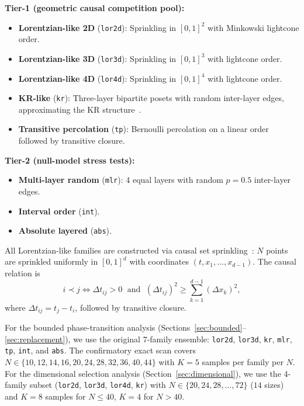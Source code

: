 \documentclass[12pt,a4paper]{article}
\begin{document}
\medskip
\noindent\textbf{Tier-1 (geometric causal competition pool):}
\begin{itemize}[nosep]
\item \textbf{Lorentzian-like 2D} (\texttt{lor2d}): Sprinkling in $[0,1]^2$
with Minkowski lightcone order.
\item \textbf{Lorentzian-like 3D} (\texttt{lor3d}): Sprinkling in $[0,1]^3$
with lightcone order.
\item \textbf{Lorentzian-like 4D} (\texttt{lor4d}): Sprinkling in $[0,1]^4$
with lightcone order.
\item \textbf{KR-like} (\texttt{kr}): Three-layer bipartite posets with random
inter-layer edges, approximating the KR structure~\cite{kleitman1975}.
\item \textbf{Transitive percolation} (\texttt{tp}): Bernoulli percolation on a
linear order followed by transitive closure.
\end{itemize}

\noindent\textbf{Tier-2 (null-model stress tests):}
\begin{itemize}[nosep]
\item \textbf{Multi-layer random} (\texttt{mlr}): 4 equal layers with random
$p = 0.5$ inter-layer edges.
\item \textbf{Interval order} (\texttt{int}).
\item \textbf{Absolute layered} (\texttt{abs}).
\end{itemize}

All Lorentzian-like families are constructed via causal set
sprinkling~\cite{bombelli1987}: $N$ points are sprinkled uniformly in $[0,1]^d$
with coordinates $(t, x_1, \ldots, x_{d-1})$. The causal relation is
\begin{equation}
    i \prec j \iff \Delta t_{ij} > 0 \;\text{ and }\;
    (\Delta t_{ij})^2 \geq \sum_{k=1}^{d-1} (\Delta x_k)^2,
    \label{eq:causal}
\end{equation}
where $\Delta t_{ij} = t_j - t_i$, followed by transitive closure.

For the bounded phase-transition analysis
(Sections~\ref{sec:bounded}--\ref{sec:replacement}), we use the original
7-family ensemble: \texttt{lor2d}, \texttt{lor3d}, \texttt{kr},
\texttt{mlr}, \texttt{tp}, \texttt{int}, and \texttt{abs}. The confirmatory
exact scan covers $N \in \{10, 12, 14, 16, 20, 24, 28, 32, 36, 40, 44\}$ with
$K = 5$ samples per family per $N$. For the dimensional selection analysis
(Section~\ref{sec:dimensional}), we use the 4-family subset (\texttt{lor2d},
\texttt{lor3d}, \texttt{lor4d}, \texttt{kr}) with
$N \in \{20, 24, 28, \ldots, 72\}$ ($14$ sizes) and $K = 8$ samples for
$N \leq 40$, $K = 4$ for $N > 40$.
\end{document}
